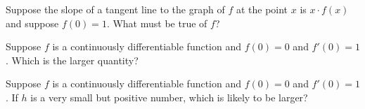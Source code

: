 \documentclass{ximera}
\newcommand{\recommendation}[1]{}
\newcommand{\GoodQuestions}[1]{}
\begin{document}
\begin{shuffle}
\begin{problem}
  Suppose the slope of a tangent line to the graph of $f$ at the point $x$ is $x \cdot f(x)$ and suppose $f(0) = 1$.  What must be true of $f$?
  \begin{multipleChoice}
  \end{multipleChoice}
\end{problem}






\begin{problem}
  Suppose $f$ is a continuously differentiable function and $f(0) = 0$ and $f'(0) = 1$.  Which is the larger quantity?
  \begin{multipleChoice}
  \end{multipleChoice}
\end{problem}

\begin{problem}
  Suppose $f$ is a continuously differentiable function and $f(0) = 0$ and $f'(0) = 1$. If $h$ is a very small but positive number, which is likely to be larger?
  \begin{multipleChoice}
  \end{multipleChoice}
\end{problem}


  

\end{shuffle}
\end{document}
